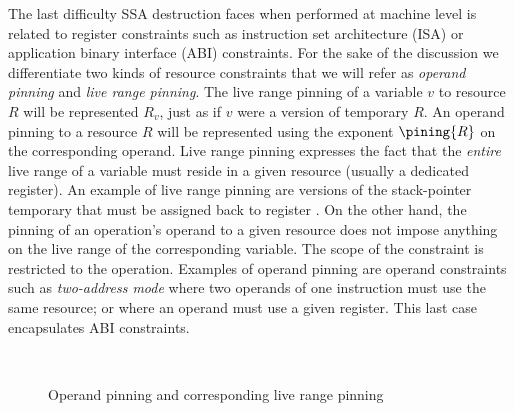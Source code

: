 The last difficulty SSA destruction faces when performed at machine level is related to register constraints such as instruction set architecture (ISA) or application binary interface (ABI) constraints. 
For the sake of the discussion we differentiate two kinds of resource constraints that we will refer as \emph{operand pinning} and \emph{live range pinning}. 
The live range pinning of a variable $v$ to resource $R$ will be represented $R_v$, just as if $v$ were a version of temporary $R$. 
An operand pinning to a resource $R$ will be represented using the exponent $\pining{R}$ on the corresponding operand. 
Live range pinning expresses the fact that the \emph{entire} live range of a variable must reside in a given resource (usually a dedicated register). 
An example of live range pinning are versions of the stack-pointer temporary that must be assigned back to register \SP{}. 
On the other hand, the pinning of an operation's operand to a given resource does not impose anything on the live range of the corresponding variable. 
The scope of the constraint is restricted to the operation. 
Examples of operand pinning are operand constraints such as \emph{two-address mode} where two operands of one instruction must use the same resource; 
or where an operand must use a given register. 
This last case encapsulates ABI constraints.
\begin{figure}[h]
\hfill
{}
\\
\hfill
{}
\caption{\label{fig:alternative_ssa_destruction:pining}Operand pinning and corresponding live range pinning}
\end{figure}

